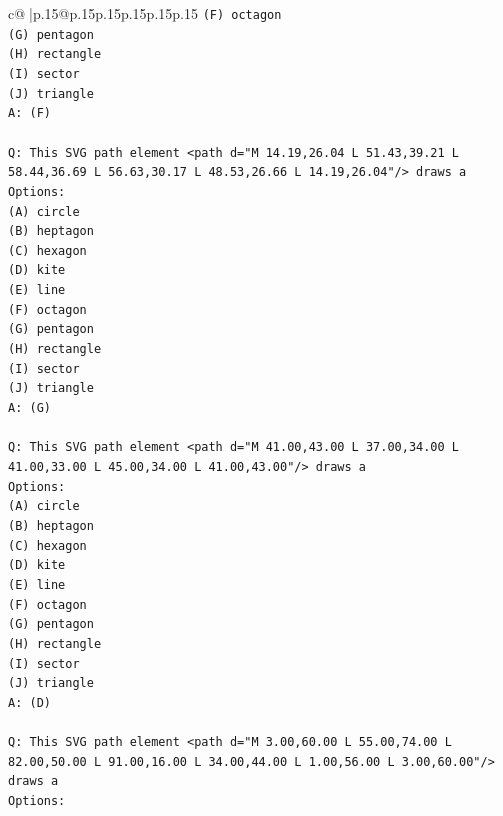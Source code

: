 \documentclass{article}
\begin{document}
{\begin{supertabular}{c@{$\;$}|p{.15\linewidth}@{}p{.15\linewidth}p{.15\linewidth}p{.15\linewidth}p{.15\linewidth}p{.15\linewidth}}
{{{\texttt{(F) octagon} \\
\texttt{(G) pentagon} \\
\texttt{(H) rectangle} \\
\texttt{(I) sector} \\
\texttt{(J) triangle} \\
\texttt{A: (F)} \\
\\ 
\texttt{Q: This SVG path element <path d="M 14.19,26.04 L 51.43,39.21 L 58.44,36.69 L 56.63,30.17 L 48.53,26.66 L 14.19,26.04"/> draws a} \\
\texttt{Options:} \\
\texttt{(A) circle} \\
\texttt{(B) heptagon} \\
\texttt{(C) hexagon} \\
\texttt{(D) kite} \\
\texttt{(E) line} \\
\texttt{(F) octagon} \\
\texttt{(G) pentagon} \\
\texttt{(H) rectangle} \\
\texttt{(I) sector} \\
\texttt{(J) triangle} \\
\texttt{A: (G)} \\
\\ 
\texttt{Q: This SVG path element <path d="M 41.00,43.00 L 37.00,34.00 L 41.00,33.00 L 45.00,34.00 L 41.00,43.00"/> draws a} \\
\texttt{Options:} \\
\texttt{(A) circle} \\
\texttt{(B) heptagon} \\
\texttt{(C) hexagon} \\
\texttt{(D) kite} \\
\texttt{(E) line} \\
\texttt{(F) octagon} \\
\texttt{(G) pentagon} \\
\texttt{(H) rectangle} \\
\texttt{(I) sector} \\
\texttt{(J) triangle} \\
\texttt{A: (D)} \\
\\ 
\texttt{Q: This SVG path element <path d="M 3.00,60.00 L 55.00,74.00 L 82.00,50.00 L 91.00,16.00 L 34.00,44.00 L 1.00,56.00 L 3.00,60.00"/> draws a} \\
\texttt{Options:} \\
}}}
\end{supertabular}}
\end{document}
